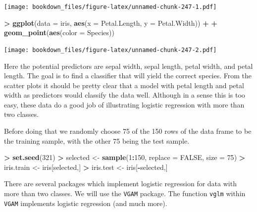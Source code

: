 \documentclass[
]{krantz}
\makeatletter
\newenvironment{Shaded}{\begin{snugshade}}{\end{snugshade}}
\newcommand{\DataTypeTok}[1]{\textcolor[rgb]{0.27,0.27,0.27}{#1}}
\newcommand{\DecValTok}[1]{\textcolor[rgb]{0.06,0.06,0.06}{#1}}
\newcommand{\KeywordTok}[1]{\textcolor[rgb]{0.27,0.27,0.27}{\textbf{#1}}}
\newcommand{\NormalTok}[1]{#1}
\newcommand{\OperatorTok}[1]{\textcolor[rgb]{0.43,0.43,0.43}{\textbf{#1}}}
\newcommand{\OtherTok}[1]{\textcolor[rgb]{0.37,0.37,0.37}{#1}}
\newcommand{\StringTok}[1]{\textcolor[rgb]{0.5,0.5,0.5}{#1}}
\newenvironment{kframe}{%
\medskip{}
\setlength{\fboxsep}{.8em}
 \def\at@end@of@kframe{}%
 \ifinner\ifhmode%
  \def\at@end@of@kframe{\end{minipage}}%
  \begin{minipage}{\columnwidth}%
 \fi\fi%
 \def\FrameCommand##1{\hskip\@totalleftmargin \hskip-\fboxsep
 \colorbox{shadecolor}{##1}\hskip-\fboxsep
     \hskip-\linewidth \hskip-\@totalleftmargin \hskip\columnwidth}%
 \MakeFramed {\advance\hsize-\width
   \@totalleftmargin\z@ \linewidth\hsize
   \@setminipage}}%
 {\par\unskip\endMakeFramed%
 \at@end@of@kframe}
\renewenvironment{Shaded}{\begin{kframe}}{\end{kframe}}
\makeatother
\begin{document}
\texttt{[image: bookdown\_files/figure-latex/unnamed-chunk-247-1.pdf]}

\begin{Shaded}
\begin{Highlighting}[]
\OperatorTok{\textgreater{}}\StringTok{ }\KeywordTok{ggplot}\NormalTok{(}\DataTypeTok{data =}\NormalTok{ iris, }\KeywordTok{aes}\NormalTok{(}\DataTypeTok{x =}\NormalTok{ Petal.Length, }\DataTypeTok{y =}\NormalTok{ Petal.Width)) }\OperatorTok{+}\StringTok{ }
\OperatorTok{+}\StringTok{   }\KeywordTok{geom\_point}\NormalTok{(}\KeywordTok{aes}\NormalTok{(}\DataTypeTok{color =}\NormalTok{ Species))}
\end{Highlighting}
\end{Shaded}

\texttt{[image: bookdown\_files/figure-latex/unnamed-chunk-247-2.pdf]}

Here the potential predictors are sepal width, sepal length, petal width, and petal length. The goal is to find a classifier that will yield the correct species. From the scatter plots it should be pretty clear that a model with petal length and petal width as predictors would classify the data well. Although in a sense this is too easy, these data do a good job of illustrating logistic regression with more than two classes.

Before doing that we randomly choose 75 of the 150 rows of the data frame to be the training sample, with the other 75 being the test sample.

\begin{Shaded}
\begin{Highlighting}[]
\OperatorTok{\textgreater{}}\StringTok{ }\KeywordTok{set.seed}\NormalTok{(}\DecValTok{321}\NormalTok{)}
\OperatorTok{\textgreater{}}\StringTok{ }\NormalTok{selected \textless{}{-}}\StringTok{ }\KeywordTok{sample}\NormalTok{(}\DecValTok{1}\OperatorTok{:}\DecValTok{150}\NormalTok{, }\DataTypeTok{replace =} \OtherTok{FALSE}\NormalTok{, }\DataTypeTok{size =} \DecValTok{75}\NormalTok{)}
\OperatorTok{\textgreater{}}\StringTok{ }\NormalTok{iris.train \textless{}{-}}\StringTok{ }\NormalTok{iris[selected,]}
\OperatorTok{\textgreater{}}\StringTok{ }\NormalTok{iris.test \textless{}{-}}\StringTok{ }\NormalTok{iris[}\OperatorTok{{-}}\NormalTok{selected,]}
\end{Highlighting}
\end{Shaded}

There are several packages which implement logistic regression for data with more than two classes. We will use the \texttt{VGAM} package. The function \texttt{vglm} within \texttt{VGAM} implements logistic regression (and much more).
\end{document}
